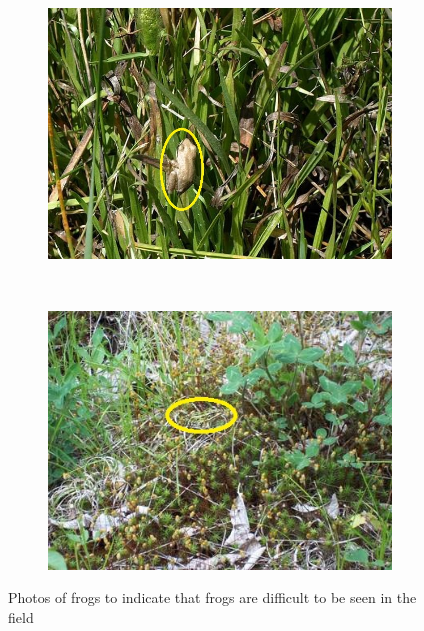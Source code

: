\begin{figure}[htb!]
\centering
      \begin{subfigure}[b]{0.5\textwidth}
           \includegraphics[width=1\textwidth,height=0.75\textwidth]{image/Ch1/unseen_frog_1.jpg}
    \end{subfigure}%
	~~
	      \begin{subfigure}[b]{0.5\textwidth}
           \includegraphics[width=1\textwidth,height=0.75\textwidth]{image/Ch1/unseen_frog_2.jpg}
    \end{subfigure}%
\caption[Photos of frogs]{Photos of frogs to indicate that frogs are difficult to be seen in the field}
\label{fig:Ch1_frogs}       %
\end{figure}



